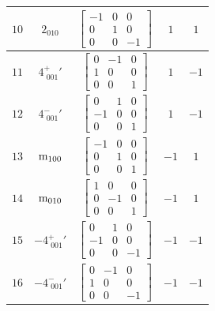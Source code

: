 \documentclass[fleqn,8pt]{jsarticle}
\begin{document}
\begin{longtable}{ccccc}
$ 10 $ & $ 2{}_{010} $ & $ \begin{bmatrix} -1 & 0 & 0 \\ 0 & 1 & 0 \\ 0 & 0 & -1 \end{bmatrix} $ & $ 1 $ & $ 1 $ \\ \hline
$ 11 $ & $ 4^{+}_{\,\,001}{}' $ & $ \begin{bmatrix} 0 & -1 & 0 \\ 1 & 0 & 0 \\ 0 & 0 & 1 \end{bmatrix} $ & $ 1 $ & $ -1 $ \\ \hline
$ 12 $ & $ 4^{-}_{\,\,001}{}' $ & $ \begin{bmatrix} 0 & 1 & 0 \\ -1 & 0 & 0 \\ 0 & 0 & 1 \end{bmatrix} $ & $ 1 $ & $ -1 $ \\ \hline
$ 13 $ & $ {\rm m}_{100} $ & $ \begin{bmatrix} -1 & 0 & 0 \\ 0 & 1 & 0 \\ 0 & 0 & 1 \end{bmatrix} $ & $ -1 $ & $ 1 $ \\ \hline
$ 14 $ & $ {\rm m}_{010} $ & $ \begin{bmatrix} 1 & 0 & 0 \\ 0 & -1 & 0 \\ 0 & 0 & 1 \end{bmatrix} $ & $ -1 $ & $ 1 $ \\ \hline
$ 15 $ & $ -4^{+}_{\,\,001}{}' $ & $ \begin{bmatrix} 0 & 1 & 0 \\ -1 & 0 & 0 \\ 0 & 0 & -1 \end{bmatrix} $ & $ -1 $ & $ -1 $ \\ \hline
$ 16 $ & $ -4^{-}_{\,\,001}{}' $ & $ \begin{bmatrix} 0 & -1 & 0 \\ 1 & 0 & 0 \\ 0 & 0 & -1 \end{bmatrix} $ & $ -1 $ & $ -1 $ \\
\end{longtable}
\end{document}
